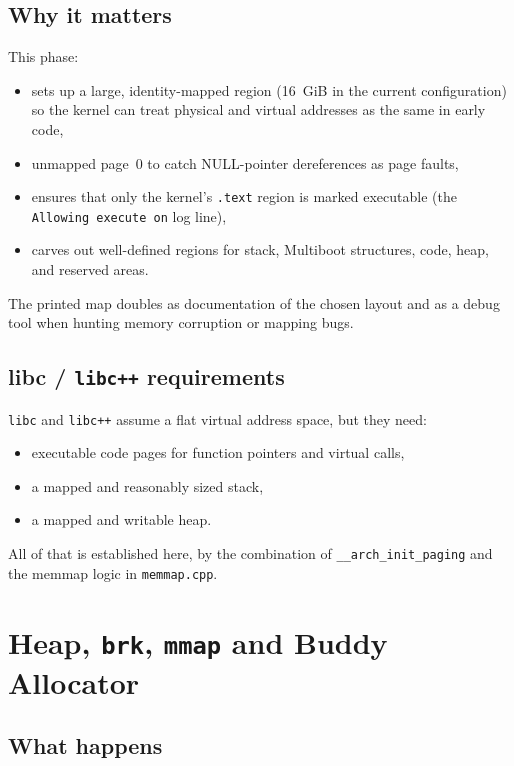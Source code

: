 \documentclass[a4paper,11pt]{article}
\begin{document}
\subsection{Why it matters}

This phase:

\begin{itemize}
  \item sets up a large, identity-mapped region (16~GiB in the current
        configuration) so the kernel can treat physical and virtual
        addresses as the same in early code,
  \item unmapped page~0 to catch NULL-pointer dereferences as page
        faults,
  \item ensures that only the kernel’s \texttt{.text} region is marked
        executable (the \texttt{Allowing execute on} log line),
  \item carves out well-defined regions for stack, Multiboot structures,
        code, heap, and reserved areas.
\end{itemize}

The printed map doubles as documentation of the chosen layout and as a
debug tool when hunting memory corruption or mapping bugs.

\subsection{libc / \texorpdfstring{\texttt{libc++}}{libc++} requirements}

\texttt{libc} and \texttt{libc++} assume a flat virtual address space, but
they need:

\begin{itemize}
  \item executable code pages for function pointers and virtual calls,
  \item a mapped and reasonably sized stack,
  \item a mapped and writable heap.
\end{itemize}

All of that is established here, by the combination of
\texttt{\_\_arch\_init\_paging} and the memmap logic in
\texttt{memmap.cpp}.

\section{Heap, \texorpdfstring{\texttt{brk}}{brk}, \texorpdfstring{\texttt{mmap}}{mmap} and Buddy Allocator}

\subsection{What happens}
\end{document}
